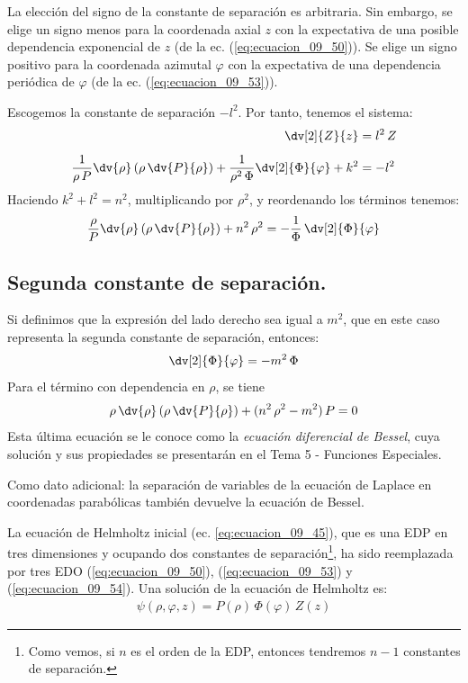 La elección del signo de la constante de separación es arbitraria. Sin embargo, se elige un signo menos para la coordenada axial $z$ con la expectativa de una posible dependencia exponencial de $z$ (de la ec. (\ref{eq:ecuacion_09_50})). Se elige un signo positivo para la coordenada azimutal $\varphi$ con la expectativa de una dependencia periódica de $\varphi$ (de la ec. (\ref{eq:ecuacion_09_53})).
\par
Escogemos la constante de separación $- l^{2}$. Por tanto, tenemos el sistema:
\begin{align}
\dv[2]{Z}{z} &= l^{2} \, Z \label{eq:ecuacion_09_50} \\[0.5em]
\dfrac{1}{\rho \, P} \dv{\rho} \left( \rho \, \dv{P}{\rho} \right) + \dfrac{1}{\rho^{2} \, \Phi} \dv[2]{\Phi}{\varphi} + k^{2} &= - l^{2} \label{eq:ecuacion_09_51}
\end{align}
Haciendo $k^{2} + l^{2} = n^{2}$, multiplicando por $\rho^{2}$, y reordenando los términos tenemos:
\begin{align}
\dfrac{\rho}{P} \dv{\rho} \left( \rho \, \dv{P}{\rho} \right) + n^{2} \, \rho^{2} = - \dfrac{1}{\Phi} \, \dv[2]{\Phi}{\varphi}
\label{eq:ecuacion_09_52}
\end{align}

\subsection{Segunda constante de separación.}

Si definimos que la expresión del lado derecho sea igual a $m^{2}$, que en este caso representa la segunda constante de separación, entonces:
\begin{align}
\dv[2]{\Phi}{\varphi} = - m^{2} \, \Phi
\label{eq:ecuacion_09_53}
\end{align}
Para el término con dependencia en $\rho$, se tiene
\begin{align}
\rho \, \dv{\rho} \left( \rho \, \dv{P}{\rho} \right) + (n^{2} \, \rho^{2} - m^{2}) \, P = 0
\label{eq:ecuacion_09_54}
\end{align}
Esta última ecuación se le conoce como la \emph{ecuación diferencial de Bessel}, cuya solución y sus propiedades se presentarán en el Tema 5 - Funciones Especiales. 
\par
Como dato adicional: la separación de variables de la ecuación de Laplace en coordenadas parabólicas también devuelve la ecuación de Bessel.
\par
La ecuación de Helmholtz inicial (ec. \ref{eq:ecuacion_09_45}), que es una EDP en tres dimensiones y ocupando dos constantes de separación\footnote{Como vemos, si $n$ es el orden de la EDP, entonces tendremos $n-1$ constantes de separación.}, ha sido reemplazada por tres EDO (\ref{eq:ecuacion_09_50}), (\ref{eq:ecuacion_09_53}) y (\ref{eq:ecuacion_09_54}). Una solución de la ecuación de Helmholtz es:
\begin{align}
\psi (\rho, \varphi, z) = P(\rho) \, \Phi (\varphi) \, Z(z)
\label{eq:ecuacion_09_55}    
\end{align}

